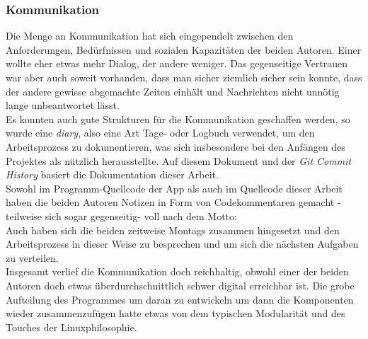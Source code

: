 \documentclass[a4paper,11pt]{article}
\begin{document}
\subsubsection{Kommunikation}

Die Menge an Kommunikation hat sich eingependelt zwischen den Anforderungen, Bedürfnissen und sozialen Kapazitäten der beiden Autoren. Einer wollte eher etwas mehr Dialog, der andere weniger. Das gegenseitige Vertrauen war aber auch soweit vorhanden, dass man sicher ziemlich sicher sein konnte, dass der andere gewisse abgemachte Zeiten einhält und Nachrichten nicht unnötig lange unbeantwortet lässt.\\

Es konnten auch gute Strukturen für die Kommunikation geschaffen werden, so wurde eine \textit{diary}, also eine Art Tage- oder Logbuch verwendet, um den Arbeitsprozess zu dokumentieren, was sich insbesondere bei den Anfängen des Projektes als nützlich herausstellte. Auf diesem Dokument und der \textit{Git Commit History} basiert die Dokumentation dieser Arbeit.\\

Sowohl im Programm-Quellcode der App als auch im Quellcode dieser Arbeit haben die beiden Autoren Notizen in Form von Codekommentaren gemacht - teilweise sich sogar gegenseitig- voll nach dem Motto: \\

Auch haben sich die beiden zeitweise Montags zusammen hingesetzt und den Arbeitsprozess in dieser Weise zu besprechen und um sich die nächsten Aufgaben zu verteilen.\\

Insgesamt verlief die Kommunikation doch reichhaltig, obwohl einer der beiden Autoren doch etwas überdurchschnittlich schwer digital erreichbar ist. Die grobe Aufteilung des Programmes um daran zu entwickeln um dann die Komponenten wieder zusammenzufügen hatte etwas von dem typischen Modularität und des Touches der Linuxphilosophie.
\end{document}
